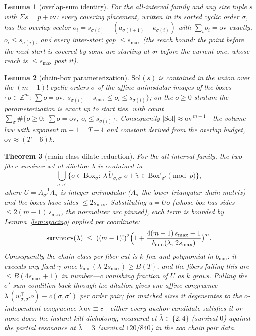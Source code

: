\documentclass[11pt,a4paper]{article}
\numberwithin{equation}{section}
\theoremstyle{plain}
\theoremstyle{plain}
\newtheorem{theorem}{Theorem}[section]
\newtheorem{lemma}[theorem]{Lemma}
\theoremstyle{definition}
\theoremstyle{remark}
\newcommand{\Z}{\mathbb{Z}}
\begin{document}
\begin{lemma}[overlap-sum identity]\label{lem:overlapsum}
For the all-interval family and any size tuple $s$ with
$\Sigma s=p+\mathrm{ov}$: every covering placement, written in its
sorted cyclic order $\sigma$, has the overlap vector
$o_i=s_{\sigma(i)}-(a_{\sigma(i+1)}-a_{\sigma(i)})$ with
$\sum_i o_i=\mathrm{ov}$ exactly, $o_i\le s_{\sigma(i)}$, and every
inter-start gap $\le s_{\max}$ (the reach bound: the point before the
next start is covered by some arc starting at or before the current
one, whose reach is $\le s_{\max}$ past it).
\end{lemma}

\begin{lemma}[chain-box parameterization]\label{lem:chainbox}
$\mathrm{Sol}(s)$ is contained in the union over the $(m-1)!$ cyclic
orders $\sigma$ of the affine-unimodular images of the boxes
$\{o\in\Z^m:\ \sum o=\mathrm{ov},\ s_{\sigma(i)}-s_{\max}\le o_i\le
s_{\sigma(i)}\}$; on the $o\ge0$ stratum the parameterization is exact
up to start ties, with count
$\sum_\sigma\#\{o\ge0:\ \sum o=\mathrm{ov},\ o_i\le s_{\sigma(i)}\}$.
Consequently $|\mathrm{Sol}|\approx\mathrm{ov}^{\,m-1}$---the volume
law with exponent $m-1=T-4$ and constant derived from the overlap
budget, $\mathrm{ov}\approx(T-6)k$.
\end{lemma}

\begin{theorem}[chain-class dilate reduction]\label{thm:chaindilate}
For the all-interval family, the two-fiber survivor set at dilation
$\lambda$ is contained in
\[
\bigcup_{\sigma,\sigma'}\bigl\{o\in\mathrm{Box}_\sigma:\;
\lambda\,\tilde U_{\sigma,\sigma'}\,o+\tilde v\in
\mathrm{Box}'_{\sigma'}\pmod p\bigr\},
\]
where $\tilde U=A_{\sigma'}^{-1}A_\sigma$ is integer-unimodular
($A_\sigma$ the lower-triangular chain matrix) and the boxes have
sides $\le 2s_{\max}$. Substituting $u=\tilde Uo$ (whose box has sides
$\le 2(m{-}1)\,s_{\max}$, the normalizer arc pinned), each term is bounded by
Lemma~\ref{lem:spacing} applied per coordinate:
\[
\mathrm{survivors}(\lambda)\;\le\;((m-1)!)^2
\Bigl(1+\frac{4(m-1)\,s_{\max}+1}{b_{\min}(\lambda,\,2s_{\max})}\bigr)^{m}.
\]
Consequently the chain-class per-fiber cut is $k$-free and polynomial
in $b_{\min}$: it exceeds any fixed $\gamma$ once
$b_{\min}(\lambda,2s_{\max})\ge B(T)$, and the fibers failing this are
$\le B(4s_{\max}+1)$ in number---a vanishing fraction of $U$ as $k$
grows. Pulling the $\sigma'$-sum condition back through the dilation
gives one affine congruence
$\lambda\,(w^\top_{\sigma,\sigma'}o)\equiv c(\sigma,\sigma')$ per
order pair; for matched sizes it degenerates to the $o$-independent
congruence $\lambda\,\mathrm{ov}\equiv c$---either every anchor
candidate satisfies it or none does: the instant-kill dichotomy,
measured at $\bar\lambda\in\{2,4\}$ (survival $0$) against the partial
resonance at $\bar\lambda=3$ (survival $120/840$) in the zoo chain pair
data.
\end{theorem}
\end{document}
